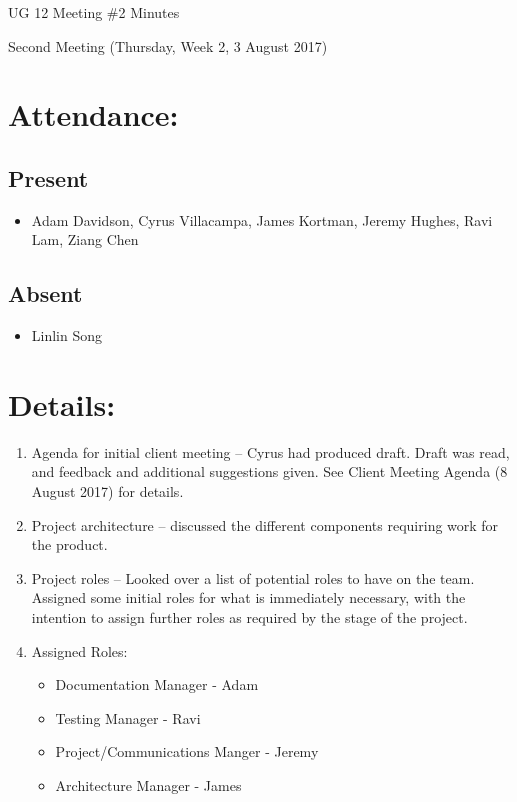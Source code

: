 \documentclass{article}
\begin{document}
\begin{adjustwidth}{2.5em}{0pt}
\begin{center}
\Large{UG 12 Meeting \#2 Minutes}\\
\end{center}
\end{adjustwidth}


Second Meeting (Thursday, Week 2, 3 August 2017)
\section{Attendance:}
\subsection*{Present}
\begin{itemize}
\item Adam Davidson, Cyrus Villacampa, James Kortman, Jeremy Hughes, Ravi Lam, Ziang Chen
\end{itemize}
\subsection*{Absent}
\begin{itemize}
\item Linlin Song
\end {itemize}

\section{Details:}
\begin{enumerate}
\item Agenda for initial client meeting – Cyrus had produced draft. Draft was read, and feedback and additional suggestions given. See Client Meeting Agenda (8 August 2017) for details.
\item Project architecture – discussed the different components requiring work for the product.
\item  Project roles – Looked over a list of potential roles to have on the team. Assigned some initial roles for what is immediately necessary, with the intention to assign further roles as required by the stage of the project.
\item Assigned Roles:
\begin{itemize}
\item Documentation Manager - Adam
\item Testing Manager - Ravi
\item Project/Communications Manger - Jeremy
\item Architecture Manager - James
\end{itemize}
\end{enumerate}
\end{document}
